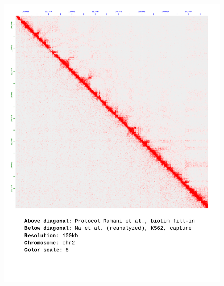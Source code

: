 \documentclass[a4paper,14pt]{extarticle}
\begin{document}
\begin{figure}[hp!] \includegraphics[width=1\textwidth]{ma-pe_s30_chr2_100kb_8.pdf} \end{figure}
\end{document}
